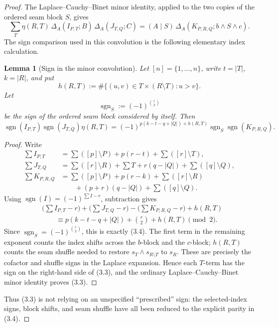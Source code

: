 \documentclass[11pt]{article}
\newtheorem{lemma}{Lemma}
\begin{document}
\begin{proof}
The Laplace--Cauchy--Binet minor identity, applied to the two copies of the
ordered seam block \(S\), gives
\[
\sum_T\eta(R,T)\,
\Delta_A(I_{P,T};B)\,
\Delta_A(J_{T,Q};C)
=(A\mid S)\,\Delta_A(K_{P,R,Q};b\wedge S\wedge c).
\tag{3.3}
\]
The sign comparison used in this convolution is the following elementary
index calculation.

\begin{lemma}[Sign in the minor convolution]
Let \([n]=\{1,\ldots,n\}\), write \(t=\lvert T\rvert\), \(k=\lvert R\rvert\),
and put
\[
h(R,T):=\#\{(u,v)\in T\times(R\setminus T):u>v\}.
\]
Let
\[
\operatorname{sgn}_S:=(-1)^{\binom r2}
\]
be the sign of the ordered seam block considered by itself. Then
\[
\operatorname{sgn}(I_{P,T})\operatorname{sgn}(J_{T,Q})\eta(R,T)
=(-1)^{p(k-t-q+\lvert Q\rvert)+h(R,T)}
\operatorname{sgn}_S\operatorname{sgn}(K_{P,R,Q}).
\tag{3.4}
\]
\end{lemma}

\begin{proof}
Write
\[
\begin{aligned}
\sum I_{P,T}
 &=\sum([p]\setminus P)+p(r-t)+\sum([r]\setminus T),\\
\sum J_{T,Q}
 &=\sum([r]\setminus R)+\sum T
   +r(q-\lvert Q\rvert)+\sum([q]\setminus Q),\\
\sum K_{P,R,Q}
 &=\sum([p]\setminus P)+p(r-k)+\sum([r]\setminus R)\\
 &\qquad +(p+r)(q-\lvert Q\rvert)+\sum([q]\setminus Q).
\end{aligned}
\]
Using \(\operatorname{sgn}(I)=(-1)^{\sum I-r}\), subtraction gives
\[
\begin{aligned}
&\bigl(\sum I_{P,T}-r\bigr)
 +\bigl(\sum J_{T,Q}-r\bigr)
 -\bigl(\sum K_{P,R,Q}-r\bigr)
 +h(R,T)\\
&\qquad\equiv
p(k-t-q+\lvert Q\rvert)+\binom r2+h(R,T)
\pmod 2.
\end{aligned}
\]
Since \(\operatorname{sgn}_S=(-1)^{\binom r2}\), this is exactly (3.4).
The first term in the remaining exponent counts the index shifts across the
\(b\)-block and the \(c\)-block; \(h(R,T)\) counts the seam shuffle needed to
restore \(s_T\wedge s_{R\setminus T}\) to \(s_R\). These are precisely the
cofactor and shuffle signs in the Laplace expansion. Hence each \(T\)-term
has the sign on the right-hand side of (3.3), and the ordinary
Laplace--Cauchy--Binet minor identity proves (3.3).
\end{proof}

Thus (3.3) is not relying on an unspecified ``prescribed'' sign: the
selected-index signs, block shifts, and seam shuffle have all been reduced to
the explicit parity in (3.4).


\end{proof}
\end{document}
